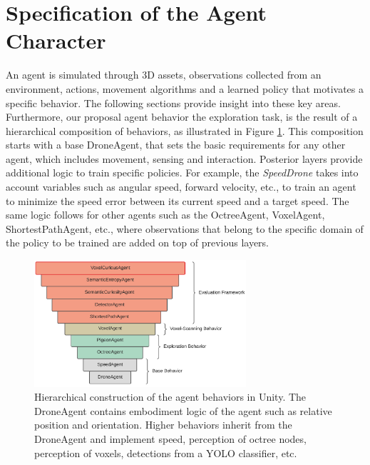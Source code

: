 
\section{Specification of the Agent Character}\label{chap:3:character}

An agent is simulated through 3D assets, observations collected from an environment, actions, movement algorithms and a learned policy that motivates a specific behavior. The following sections provide insight into these key areas.
Furthermore, our proposal agent behavior the exploration task, is the result of a hierarchical composition of behaviors, as illustrated in Figure \ref{fig:baselines_hierarchical}. This composition starts with a base DroneAgent, that sets the basic requirements for any other agent, which includes movement, sensing and interaction. Posterior layers provide additional logic to train specific policies. For example, the \textit{SpeedDrone} takes into account variables such as angular speed, forward velocity, etc., to train an agent to  minimize the speed error between its current speed and a target speed. The same logic follows for other agents such as the OctreeAgent, VoxelAgent, ShortestPathAgent, etc., where observations that belong to the specific domain of the policy to be trained are added on top of previous layers. 

\begin{figure}[!ht]
        \centering
        \includegraphics[width=0.7\textwidth]{images/baselines_hierarchical_construction.png}
        \caption{Hierarchical construction of the agent behaviors in Unity. The DroneAgent contains embodiment logic of the agent such as relative position and orientation. Higher behaviors inherit from the DroneAgent and implement speed, perception of octree nodes, perception of voxels, detections from a YOLO classifier, etc. 
        }
        \label{fig:baselines_hierarchical}
\end{figure}

